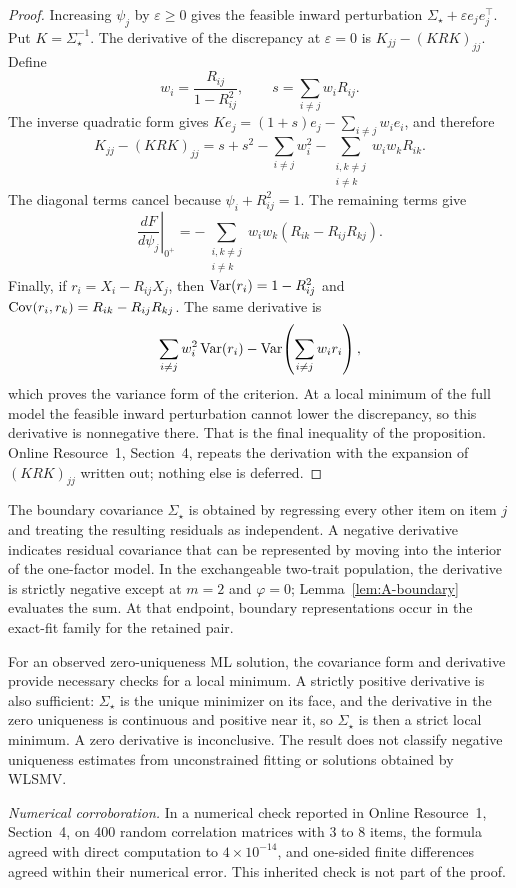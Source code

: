 \begin{proof}
Increasing $\psi_j$ by $\varepsilon\ge0$ gives the feasible inward perturbation $\Sigma_\star+\varepsilon e_je_j^{\top}$. Put $K=\Sigma_\star^{-1}$. The derivative of the discrepancy at $\varepsilon=0$ is $K_{jj}-(KRK)_{jj}$. Define
\[
w_i=\frac{R_{ij}}{1-R_{ij}^2},\qquad
s=\sum_{i\ne j}w_iR_{ij}.
\]
The inverse quadratic form gives $Ke_j=(1+s)e_j-\sum_{i\ne j}w_i e_i$, and therefore
\[
K_{jj}-(KRK)_{jj}
=s+s^2-\sum_{i\ne j}w_i^2
-\sum_{\substack{i,k\ne j\\i\ne k}}w_iw_kR_{ik}.
\]
The diagonal terms cancel because $\psi_i+R_{ij}^2=1$. The remaining terms give
\[
\left.\frac{dF}{d\psi_j}\right|_{0^+}
=-\sum_{\substack{i,k\ne j\\i\ne k}}
w_iw_k(R_{ik}-R_{ij}R_{kj}).
\]
Finally, if $r_i=X_i-R_{ij}X_j$, then $\operatorname{Var}(r_i)=1-R_{ij}^2$ and $\operatorname{Cov}(r_i,r_k)=R_{ik}-R_{ij}R_{kj}$. The same derivative is
\[
\sum_{i\ne j}w_i^2\operatorname{Var}(r_i)
-\operatorname{Var}\!\left(\sum_{i\ne j}w_i r_i\right),
\]
which proves the variance form of the criterion. At a local minimum of the full model the feasible inward perturbation cannot lower the discrepancy, so this derivative is nonnegative there. That is the final inequality of the proposition. Online Resource~1, Section~4, repeats the derivation with the expansion of $(KRK)_{jj}$ written out; nothing else is deferred.\end{proof}

The boundary covariance $\Sigma_\star$ is obtained by regressing every other item on item $j$ and treating the resulting residuals as independent. A negative derivative indicates residual covariance that can be represented by moving into the interior of the one-factor model. In the exchangeable two-trait population, the derivative is strictly negative except at $m=2$ and $\varphi=0$; Lemma~\ref{lem:A-boundary} evaluates the sum. At that endpoint, boundary representations occur in the exact-fit family for the retained pair.

For an observed zero-uniqueness ML solution, the covariance form and derivative provide necessary checks for a local minimum. A strictly positive derivative is also sufficient: $\Sigma_\star$ is the unique minimizer on its face, and the derivative in the zero uniqueness is continuous and positive near it, so $\Sigma_\star$ is then a strict local minimum. A zero derivative is inconclusive. The result does not classify negative uniqueness estimates from unconstrained fitting or solutions obtained by WLSMV.

\textit{Numerical corroboration.} In a numerical check reported in Online Resource~1, Section~4, on 400 random correlation matrices with 3 to 8 items, the formula agreed with direct computation to $4\times10^{-14}$, and one-sided finite differences agreed within their numerical error. This inherited check is not part of the proof.
